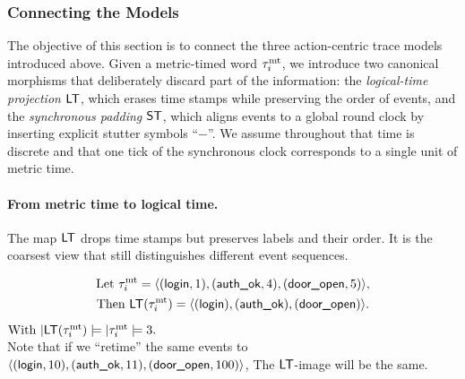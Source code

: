 \documentclass{article}
\begin{document}
  \subsubsection{Connecting the Models}
  The objective of this section is to connect the three action-centric trace models introduced above.
  Given a metric-timed word \(\tau^{\mathrm{mt}}_i\), we introduce two canonical morphisms that deliberately discard part of the information:  
  the \emph{logical-time projection} \(\mathsf{LT}\), which erases time stamps while preserving the order of events,  
  and the \emph{synchronous padding} \(\mathsf{ST}\), which aligns events to a global round clock by inserting explicit stutter symbols “\(-\)”.  
  We assume throughout that time is discrete and that one tick of the synchronous clock corresponds to a single unit of metric time.
  
  
  \paragraph{From metric time to logical time.}
  The map \(\mathsf{LT}\) drops time stamps but preserves labels and their order. It is the coarsest view that still distinguishes different event sequences.
  
  \begin{example}
  
  \begin{gather*}
  \text{Let }\tau^{\mathrm{mt}}_i=\langle (\textsf{login},1),(\textsf{auth\_ok},4),(\textsf{door\_open},5) \rangle ,\\
  \text{Then }\mathsf{LT}(\tau^{\mathrm{mt}}_i)=\langle (\textsf{login}),(\textsf{auth\_ok}),(\textsf{door\_open}) \rangle .
  \end{gather*}
  $\text{With }
  |\mathsf{LT}(\tau^{\mathrm{mt}}_i)|=|\tau^{\mathrm{mt}}_i|=3.$\\
  Note that if we “retime” the same events to \(\langle (\textsf{login},10),(\textsf{auth\_ok},11),(\textsf{door\_open},100) \rangle \),
  The \(\mathsf{LT}\)-image will be the same.
  \end{example}
  
\end{document}

